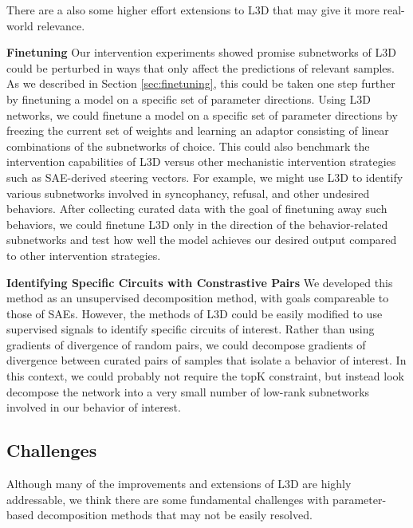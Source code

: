 \documentclass{article}
\theoremstyle{plain}
\theoremstyle{definition}
\theoremstyle{remark}
\begin{document}
There are a also some higher effort extensions to L3D that may give it more real-world relevance. 

\textbf{Finetuning}
Our intervention experiments showed promise subnetworks of L3D could be perturbed in ways that only affect the predictions of relevant samples. As we described in Section \ref{sec:finetuning}, this could be taken one step further by finetuning a model on a specific set of parameter directions. Using L3D networks, we could finetune a model on a specific set of parameter directions by freezing the current set of weights and learning an adaptor consisting of linear combinations of the subnetworks of choice. This could also benchmark the intervention capabilities of L3D versus other mechanistic intervention strategies such as SAE-derived steering vectors. For example, we might use L3D to identify various subnetworks involved in syncophancy, refusal, and other undesired behaviors. After collecting curated data with the goal of finetuning away such behaviors, we could finetune L3D only in the direction of the behavior-related subnetworks and test how well the model achieves our desired output compared to other intervention strategies. 

\textbf{Identifying Specific Circuits with Constrastive Pairs}
We developed this method as an unsupervised decomposition method, with goals compareable to those of SAEs. However, the methods of L3D could be easily modified to use supervised signals to identify specific circuits of interest. Rather than using gradients of divergence of random pairs, we could decompose gradients of divergence between curated pairs of samples that isolate a behavior of interest. In this context, we could probably not require the topK constraint, but instead look decompose the network into a very small number of low-rank subnetworks involved in our behavior of interest. 

\subsection{Challenges}
Although many of the improvements and extensions of L3D are highly addressable, we think there are some fundamental challenges with parameter-based decomposition methods that may not be easily resolved.
\end{document}
